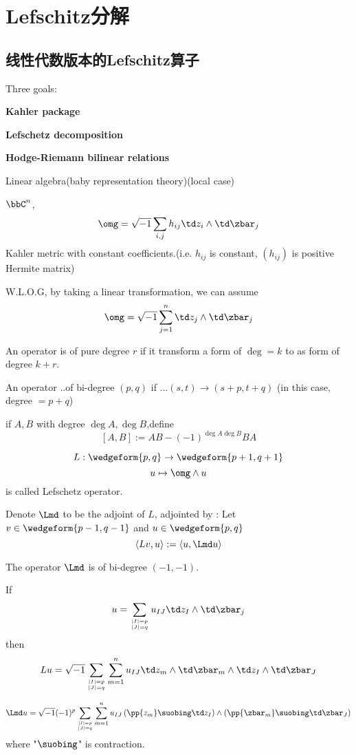 \chapter{Lefschitz分解}

\section{线性代数版本的Lefschitz算子}

Three goals:

\textbf{Kahler package}

\textbf{Lefschetz decomposition}

\textbf{Hodge-Riemann bilinear relations}

Linear algebra(baby representation theory)(local case)

$\bbC^n$,
$$\omg=\sqrt{-1}\sum_{i,j}h_{ij}\td z_i\wedge\td\zbar_j$$
Kahler metric with constant coefficients.(i.e.
$h_{ij}$ is constant, $(h_{ij})$ is positive Hermite matrix)

W.L.O.G, by taking a linear transformation, we can assume
$$\omg=\sqrt{-1}\sum_{j=1}^n\td z_j\wedge\td\zbar_j$$

\begin{notation}
An operator is of pure degree $r$ if it transform a form of $\deg=k$
to as form of degree $k+r$.

An operator ..of bi-degree $(p,q)$ if ...$(s,t)\to (s+p,t+q)$
(in this case, degree $=p+q$)

if $A,B$ with degree $\deg A,\deg B$,define
$$[A,B]:=AB-(-1)^{\deg A\deg B}BA$$
\end{notation}

\begin{definition}
$$L:\wedgeform{p,q}\to\wedgeform{p+1,q+1}$$
$$u\mapsto \omg\wedge u$$
is called Lefschetz operator.

Denote $\Lmd$ to be the adjoint of $L$, adjointed by :
Let $v\in\wedgeform{p-1,q-1}$ and $u\in\wedgeform{p,q}$
$$\langle Lv,u\rangle:=\langle u,\Lmd u\rangle$$
\end{definition}
The operator $\Lmd$ is of bi-degree $(-1,-1)$.

\begin{prop}
If
$$u=\sum_{|I|=p\atop |J|=q}u_{IJ}\td z_I\wedge\td\zbar_j$$
then
$$Lu=\sqrt{-1}\sum_{|I|=p\atop |J|=q}
 \sum_{m=1}^n
 u_{IJ}\td z_m\wedge\td\zbar_m\wedge\td z_I\wedge\td\zbar_J$$

$$
  \Lmd u
= \sqrt{-1}(-1)^p
  \sum_{|I|=p\atop|J|=q}
    \sum_{m=1}^n
      u_{IJ}
      \left(
        \pp{z_m}\suobing\td z_I
      \right)\wedge
      \left(
        \pp{\zbar_m}\suobing\td\zbar_J
      \right)
$$
where "$\suobing$" is contraction.
\end{prop}

